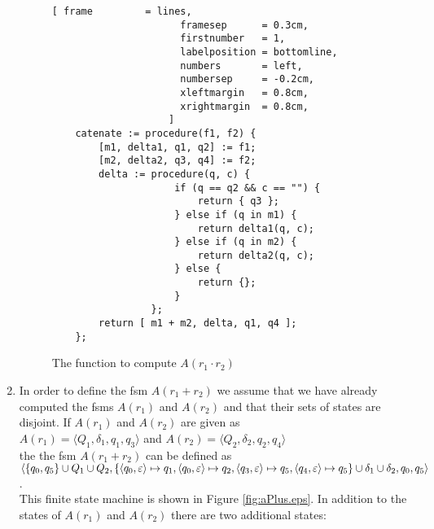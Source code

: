 \begin{enumerate}
    \begin{figure}[!ht]
    \centering
    \begin{Verbatim}[ frame         = lines, 
                      framesep      = 0.3cm, 
                      firstnumber   = 1,
                      labelposition = bottomline,
                      numbers       = left,
                      numbersep     = -0.2cm,
                      xleftmargin   = 0.8cm,
                      xrightmargin  = 0.8cm,
                    ]
    catenate := procedure(f1, f2) {
        [m1, delta1, q1, q2] := f1;
        [m2, delta2, q3, q4] := f2;
        delta := procedure(q, c) {
                     if (q == q2 && c == "") {
                         return { q3 };
                     } else if (q in m1) {
                         return delta1(q, c);
                     } else if (q in m2) {
                         return delta2(q, c);
                     } else {
                         return {};
                     }
                 };
        return [ m1 + m2, delta, q1, q4 ];
    };
    \end{Verbatim}
    \vspace*{-0.3cm}
    \caption{The function to compute $A(r_1 \cdot r_2)$}
    \label{fig:catenate.stlx}
    \end{figure}
\item In order to define the fsm  $A(r_1 + r_2)$ we assume that we have already computed
      the fsms $A(r_1)$ and $A(r_2)$ and that their sets of states are disjoint.
      If  $A(r_1)$ and $A(r_2)$ are given as
      \\[0.2cm]
      \hspace*{1.3cm}
      $A(r_1) = \langle Q_1, \delta_1, q_1, q_3 \rangle$ \quad and \quad
      $A(r_2) = \langle Q_2, \delta_2, q_2, q_4 \rangle$
      \\[0.2cm]
      the the fsm $A(r_1 + r_2)$ can be defined as
      \\[0.2cm]
      \hspace*{0.0cm}
       $\langle \{ q_0, q_5 \} \cup Q_1 \cup Q_2, 
                \{ \pair(q_0,\varepsilon) \mapsto q_1, \pair(q_0,\varepsilon) \mapsto q_2,
                   \pair(q_3,\varepsilon) \mapsto q_5, \pair(q_4,\varepsilon) \mapsto q_5 \} 
                   \cup \delta_1 \cup \delta_2, q_0, q_5 \rangle$.
      \\[0.2cm]
      This finite state machine is shown in Figure \ref{fig:aPlus.eps}.
      In addition to the states of $A(r_1)$ and $A(r_2)$ there are two additional 
      states:
      \begin{enumerate}

\end{enumerate}
\end{enumerate}
